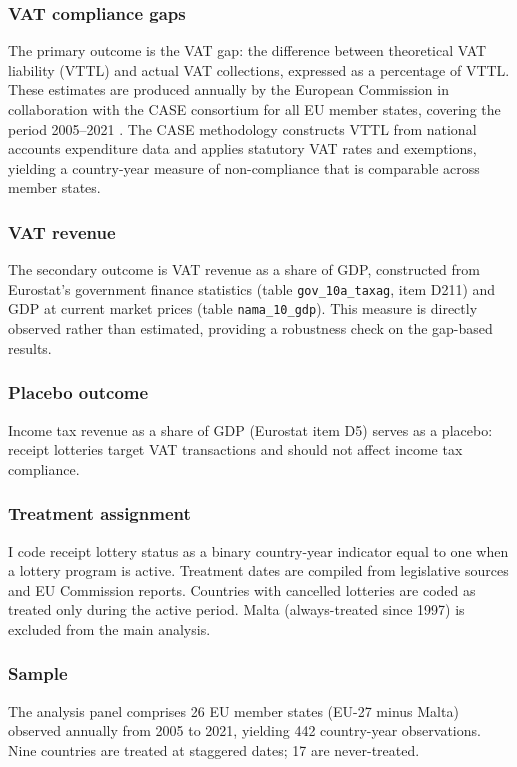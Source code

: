 \documentclass[12pt]{article}
\begin{document}
\subsubsection*{VAT compliance gaps} The primary outcome is the VAT gap: the difference between theoretical VAT liability (VTTL) and actual VAT collections, expressed as a percentage of VTTL. These estimates are produced annually by the European Commission in collaboration with the CASE consortium for all EU member states, covering the period 2005--2021 \citep{ec_vat_gap_2023}. The CASE methodology constructs VTTL from national accounts expenditure data and applies statutory VAT rates and exemptions, yielding a country-year measure of non-compliance that is comparable across member states.

\subsubsection*{VAT revenue} The secondary outcome is VAT revenue as a share of GDP, constructed from Eurostat's government finance statistics (table \texttt{gov\_10a\_taxag}, item D211) and GDP at current market prices (table \texttt{nama\_10\_gdp}). This measure is directly observed rather than estimated, providing a robustness check on the gap-based results.

\subsubsection*{Placebo outcome} Income tax revenue as a share of GDP (Eurostat item D5) serves as a placebo: receipt lotteries target VAT transactions and should not affect income tax compliance.

\subsubsection*{Treatment assignment} I code receipt lottery status as a binary country-year indicator equal to one when a lottery program is active. Treatment dates are compiled from legislative sources and EU Commission reports. Countries with cancelled lotteries are coded as treated only during the active period. Malta (always-treated since 1997) is excluded from the main analysis.

\subsubsection*{Sample} The analysis panel comprises 26 EU member states (EU-27 minus Malta) observed annually from 2005 to 2021, yielding 442 country-year observations. Nine countries are treated at staggered dates; 17 are never-treated.
\end{document}
